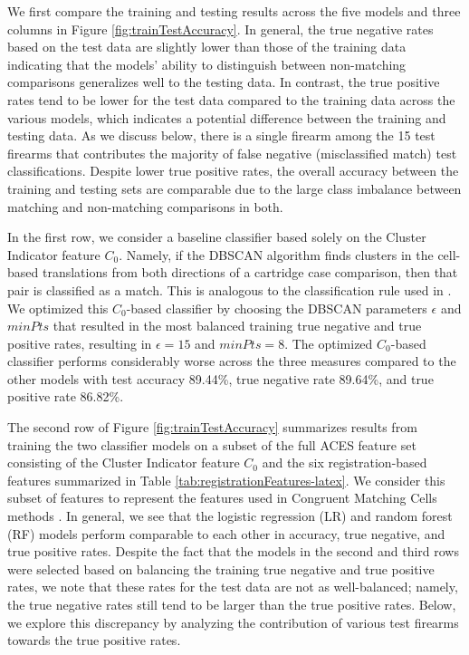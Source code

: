 \documentclass[11pt,]{isuthesis}
\begin{document}
We first compare the training and testing results across the five models and three columns in Figure \ref{fig:trainTestAccuracy}.
In general, the true negative rates based on the test data are slightly lower than those of the training data indicating that the models' ability to distinguish between non-matching comparisons generalizes well to the testing data.
In contrast, the true positive rates tend to be lower for the test data compared to the training data across the various models, which indicates a potential difference between the training and testing data.
As we discuss below, there is a single firearm among the 15 test firearms that contributes the majority of false negative (misclassified match) test classifications.
Despite lower true positive rates, the overall accuracy between the training and testing sets are comparable due to the large class imbalance between matching and non-matching comparisons in both.

In the first row, we consider a baseline classifier based solely on the Cluster Indicator feature \(C_0\).
Namely, if the DBSCAN algorithm finds clusters in the cell-based translations from both directions of a cartridge case comparison, then that pair is classified as a match.
This is analogous to the classification rule used in \citet{zhang_convergence_2021}.
We optimized this \(C_0\)-based classifier by choosing the DBSCAN parameters \(\epsilon\) and \(minPts\) that resulted in the most balanced training true negative and true positive rates, resulting in \(\epsilon = 15\) and \(minPts = 8\).
The optimized \(C_0\)-based classifier performs considerably worse across the three measures compared to the other models with test accuracy 89.44\%, true negative rate 89.64\%, and true positive rate 86.82\%.

The second row of Figure \ref{fig:trainTestAccuracy} summarizes results from training the two classifier models on a subset of the full ACES feature set consisting of the Cluster Indicator feature \(C_0\) and the six registration-based features summarized in Table \ref{tab:registrationFeatures-latex}.
We consider this subset of features to represent the features used in Congruent Matching Cells methods \citep{song_proposed_2013, zhang_convergence_2021}.
In general, we see that the logistic regression (LR) and random forest (RF) models perform comparable to each other in accuracy, true negative, and true positive rates.
Despite the fact that the models in the second and third rows were selected based on balancing the training true negative and true positive rates, we note that these rates for the test data are not as well-balanced; namely, the true negative rates still tend to be larger than the true positive rates.
Below, we explore this discrepancy by analyzing the contribution of various test firearms towards the true positive rates.
\end{document}
